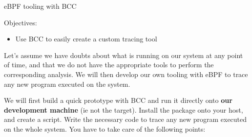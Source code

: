 \subchapter
{eBPF tooling with BCC}
{Objectives:
  \begin{itemize}
    \item Use BCC to easily create a custom tracing tool
  \end{itemize}
}

Let's assume we have doubts about what is running on our system at any point of
time, and that we do not have the appropriate tools to perform the
corresponding analysis. We will then develop our own tooling with eBPF to trace any new
program executed on the system.

We will first build a quick prototype with BCC and run it directly onto \textbf{our development machine} (ie not the target). Install the  package onto your host, and create a  script. Write the necessary code to trace any new program executed on the whole system. You have to take care of the following points:

